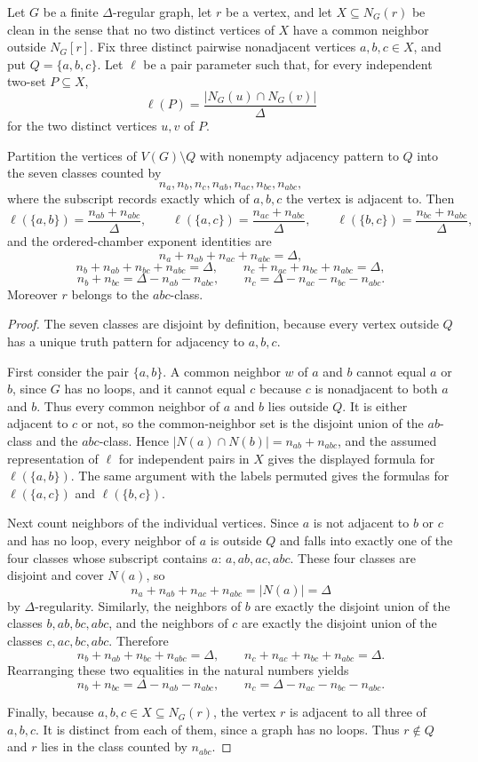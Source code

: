 \begin{helper}
Let $G$ be a finite $\Delta$-regular graph, let $r$ be a vertex, and let
$X\subseteq N_G(r)$ be clean in the sense that no two distinct vertices of
$X$ have a common neighbor outside $N_G[r]$.  Fix three distinct pairwise
nonadjacent vertices $a,b,c\in X$, and put $Q=\{a,b,c\}$.  Let $\ell$ be a
pair parameter such that, for every independent two-set $P\subseteq X$,
\[
\ell(P)=\frac{|N_G(u)\cap N_G(v)|}{\Delta}
\]
for the two distinct vertices $u,v$ of $P$.

Partition the vertices of $V(G)\setminus Q$ with nonempty adjacency pattern
to $Q$ into the seven classes counted by
\[
n_a,n_b,n_c,n_{ab},n_{ac},n_{bc},n_{abc},
\]
where the subscript records exactly which of $a,b,c$ the vertex is adjacent
to.  Then
\[
\ell(\{a,b\})=\frac{n_{ab}+n_{abc}}{\Delta},\qquad
\ell(\{a,c\})=\frac{n_{ac}+n_{abc}}{\Delta},\qquad
\ell(\{b,c\})=\frac{n_{bc}+n_{abc}}{\Delta},
\]
and the ordered-chamber exponent identities are
\[
n_a+n_{ab}+n_{ac}+n_{abc}=\Delta,
\]
\[
n_b+n_{ab}+n_{bc}+n_{abc}=\Delta,\qquad
n_c+n_{ac}+n_{bc}+n_{abc}=\Delta,
\]
\[
n_b+n_{bc}=\Delta-n_{ab}-n_{abc},
\qquad
n_c=\Delta-n_{ac}-n_{bc}-n_{abc}.
\]
Moreover $r$ belongs to the $abc$-class.
\end{helper}
\begin{proof}
The seven classes are disjoint by definition, because every vertex outside
$Q$ has a unique truth pattern for adjacency to $a,b,c$.

First consider the pair $\{a,b\}$.  A common neighbor $w$ of $a$ and $b$
cannot equal $a$ or $b$, since $G$ has no loops, and it cannot equal $c$
because $c$ is nonadjacent to both $a$ and $b$.  Thus every common neighbor
of $a$ and $b$ lies outside $Q$.  It is either adjacent to $c$ or not, so the
common-neighbor set is the disjoint union of the $ab$-class and the
$abc$-class.  Hence
$|N(a)\cap N(b)|=n_{ab}+n_{abc}$, and the assumed representation of $\ell$
for independent pairs in $X$ gives the displayed formula for
$\ell(\{a,b\})$.  The same argument with the labels permuted gives the
formulas for $\ell(\{a,c\})$ and $\ell(\{b,c\})$.

Next count neighbors of the individual vertices.  Since $a$ is not adjacent
to $b$ or $c$ and has no loop, every neighbor of $a$ is outside $Q$ and
falls into exactly one of the four classes whose subscript contains $a$:
$a,ab,ac,abc$.  These four classes are disjoint and cover $N(a)$, so
\[
n_a+n_{ab}+n_{ac}+n_{abc}=|N(a)|=\Delta
\]
by $\Delta$-regularity.  Similarly, the neighbors of $b$ are exactly the
disjoint union of the classes $b,ab,bc,abc$, and the neighbors of $c$ are
exactly the disjoint union of the classes $c,ac,bc,abc$.  Therefore
\[
n_b+n_{ab}+n_{bc}+n_{abc}=\Delta,\qquad
n_c+n_{ac}+n_{bc}+n_{abc}=\Delta.
\]
Rearranging these two equalities in the natural numbers yields
\[
n_b+n_{bc}=\Delta-n_{ab}-n_{abc},\qquad
n_c=\Delta-n_{ac}-n_{bc}-n_{abc}.
\]

Finally, because $a,b,c\in X\subseteq N_G(r)$, the vertex $r$ is adjacent to
all three of $a,b,c$.  It is distinct from each of them, since a graph has no
loops.  Thus $r\notin Q$ and $r$ lies in the class counted by $n_{abc}$.
\end{proof}
